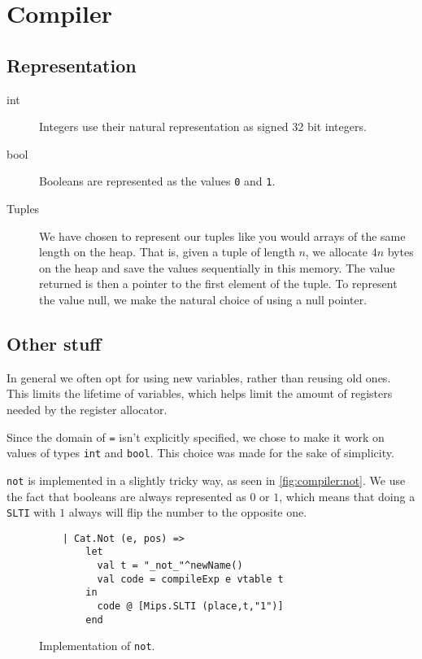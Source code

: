 \chapter{Compiler}

\section{Representation}
\begin{description}
    \item[int] {
        Integers use their natural representation as signed 32 bit integers.
    }
    \item[bool] {
        Booleans are represented as the values \texttt{0} and \texttt{1}.
    }
    \item[Tuples] {
        We have chosen to represent our tuples like you would arrays of the
        same length on the heap. That is, given a tuple of length $n$, we
        allocate $4n$ bytes on the heap and save the values sequentially in
        this memory. The value returned is then a pointer to the first element
        of the tuple. To represent the value null, we make the natural choice
        of using a null pointer.
    }
\end{description}

\section{Other stuff}

In general we often opt for using new variables, rather than reusing old ones.
This limits the lifetime of variables, which helps limit the amount of
registers needed by the register allocator.

Since the domain of \texttt{=} isn't explicitly specified, we chose to make it
work on values of types \texttt{int} and \texttt{bool}. This choice was made
for the sake of simplicity.

\texttt{not} is implemented in a slightly tricky way, as seen in
\autoref{fig:compiler:not}. We use the fact that booleans are always
represented as $0$ or $1$, which means that doing a \texttt{SLTI} with
$1$ always will flip the number to the opposite one.

\begin{figure}
    \centering
    \begin{lstlisting}
    | Cat.Not (e, pos) =>
        let
          val t = "_not_"^newName()
          val code = compileExp e vtable t
        in
          code @ [Mips.SLTI (place,t,"1")]
        end
    \end{lstlisting}
    \label{fig:compiler:not}
    \caption{Implementation of \texttt{not}.}
\end{figure}

